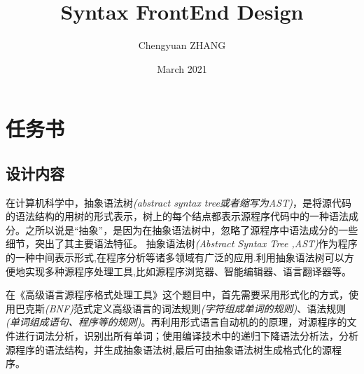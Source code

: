\documentclass{ctexrep}
\title{Syntax FrontEnd Design}
\author{Chengyuan ZHANG}
\date{March 2021}
\begin{document}
\maketitle

\chapter*{任\;务\;书}
\section*{设计内容}

在计算机科学中，抽象语法树\textit{(abstract syntax tree或者缩写为AST)}，是将源代码的语法结构的用树的形式表示，树上的每个结点都表示源程序代码中的一种语法成分。之所以说是“抽象”，是因为在抽象语法树中，忽略了源程序中语法成分的一些细节，突出了其主要语法特征。
抽象语法树\textit{(Abstract Syntax Tree ,AST)}作为程序的一种中间表示形式,在程序分析等诸多领域有广泛的应用.利用抽象语法树可以方便地实现多种源程序处理工具,比如源程序浏览器、智能编辑器、语言翻译器等。

在《高级语言源程序格式处理工具》这个题目中，首先需要采用形式化的方式，使用巴克斯\textit{(BNF)}范式定义高级语言的词法规则\textit{(字符组成单词的规则)}、语法规则\textit{(单词组成语句、程序等的规则)}。再利用形式语言自动机的的原理，对源程序的文件进行词法分析，识别出所有单词；使用编译技术中的递归下降语法分析法，分析源程序的语法结构，并生成抽象语法树,最后可由抽象语法树生成格式化的源程序。\cite{b1}\cite{b2}
\end{document}
